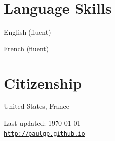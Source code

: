 \documentclass[letterpaper]{article}
\renewenvironment{itemize}{
  \begin{list}{}
    { \setlength{\itemsep}{5pt}
      \setlength{\parsep}{0pt}
      \setlength{\topsep}{0pt}
      \setlength{\leftmargin}{0em} } }{
  \end{list}}
\begin{document}
\section*{Language Skills}
\begin{itemize}
	\item English (fluent)
	\item French (fluent)
\end{itemize}
\bigskip

\section*{Citizenship}
United States, France
\begin{center}
	\begin{footnotesize}
		Last updated: \today \\
		\href{http://paulgp.github.io}{\tt http://paulgp.github.io}
	\end{footnotesize}
\end{center}
\end{document}
